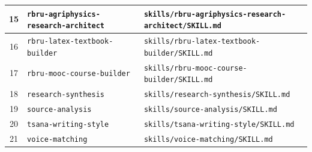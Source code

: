 \begin{longtable}{|c|p{}|p{}|}
15 & \texttt{rbru-agriphysics-research-architect} & \texttt{skills/rbru-agriphysics-research-architect/SKILL.md} \\ \hline
16 & \texttt{rbru-latex-textbook-builder} & \texttt{skills/rbru-latex-textbook-builder/SKILL.md} \\ \hline
17 & \texttt{rbru-mooc-course-builder} & \texttt{skills/rbru-mooc-course-builder/SKILL.md} \\ \hline
18 & \texttt{research-synthesis} & \texttt{skills/research-synthesis/SKILL.md} \\ \hline
19 & \texttt{source-analysis} & \texttt{skills/source-analysis/SKILL.md} \\ \hline
20 & \texttt{tsana-writing-style} & \texttt{skills/tsana-writing-style/SKILL.md} \\ \hline
21 & \texttt{voice-matching} & \texttt{skills/voice-matching/SKILL.md} \\ \hline
\end{longtable}
\normalsize
